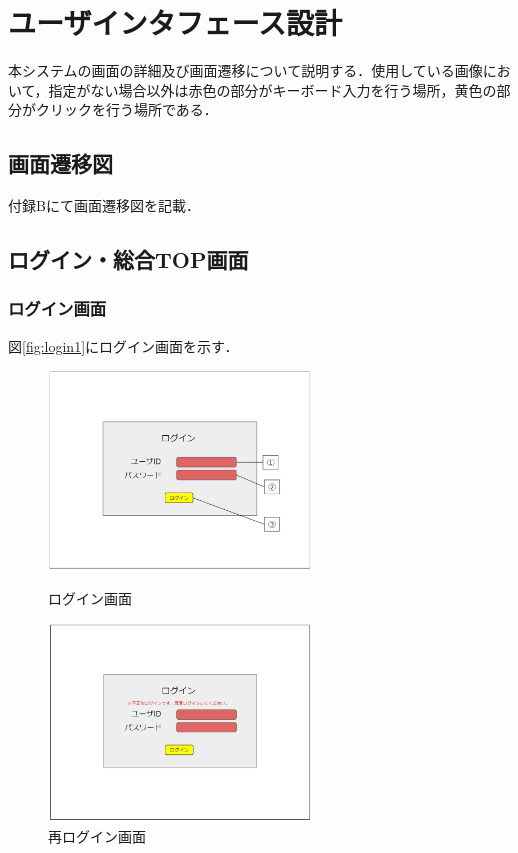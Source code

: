 

\section{ユーザインタフェース設計}
本システムの画面の詳細及び画面遷移について説明する．使用している画像において，指定がない場合以外は赤色の部分がキーボード入力を行う場所，黄色の部分がクリックを行う場所である．
\subsection{画面遷移図}
付録Bにて画面遷移図を記載．
\subsection{ログイン・総合TOP画面}

\subsubsection{ログイン画面}
図\ref{fig:login1}にログイン画面を示す．

\begin{figure}[H]
    \begin{minipage}{0.5\hsize}
        \centering
        \includegraphics[width=7cm]{UI-umino/login1.JPG}
        \caption{ログイン画面}
        \label{fig:login1}
    \end{minipage}
    \begin{minipage}{0.5\hsize}
        \centering
        \includegraphics[width=7cm]{UI-umino/login2.JPG}
        \caption{再ログイン画面}
        \label{fig:login2}
    \end{minipage} 

\end{figure}

